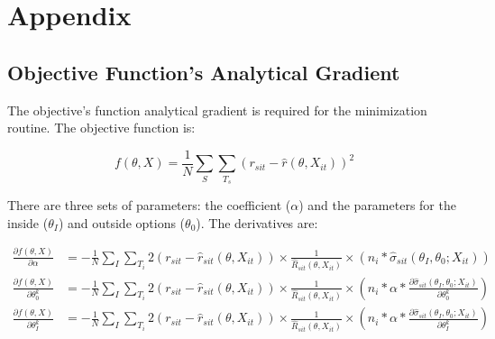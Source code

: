 \documentclass[11.5pt]{article}
\begin{document}






\newpage

\section{Appendix}

\subsection{Objective Function's Analytical Gradient}

The objective's function analytical gradient is required for the minimization routine. The objective function is:

\[f(\theta,X)= \frac{1}{N} \sum_S \sum_{T_s} (r_{sit}-\hat r(\theta,X_{it}))^2\]

There are three sets of parameters: the coefficient ($\alpha$) and the parameters for the inside ($\theta_I$) and outside options ($\theta_0$). The derivatives are:

\begin{align*}
    \frac{\partial f(\theta,X)}{\partial \alpha} &= -\frac{1}{N}\sum_I \sum_{T_i} 2(r_{sit} - \hat r_{sit}(\theta, X_{it})) \times \frac{1}{\hat R_{sit}(\theta,X_{it})}\times (n_i *  \hat \sigma_{sit}(\theta_I, \theta_0; X_{it}))\\
    \frac{\partial f(\theta,X)}{\partial \theta_0^k} & = -\frac{1}{N}\sum_I \sum_{T_i} 2(r_{sit} - \hat r_{sit}(\theta, X_{it}))  \times \frac{1}{\hat R_{sit}(\theta,X_{it})}\times  \left(n_i * \alpha *   \frac{\partial \hat\sigma_{sit}(\theta_I, \theta_0; X_{it})}{\partial \theta_0^k}\right) \\
    \frac{\partial f(\theta,X)}{\partial \theta_I^k} & = -\frac{1}{N}\sum_I \sum_{T_i} 2(r_{sit} - \hat r_{sit}(\theta, X_{it}))  \times \frac{1}{\hat R_{sit}(\theta,X_{it})}\times  \left(n_i * \alpha *   \frac{\partial \hat\sigma_{sit}(\theta_I, \theta_0; X_{it})}{\partial \theta_I^k}\right) 
\end{align*}
\end{document}
